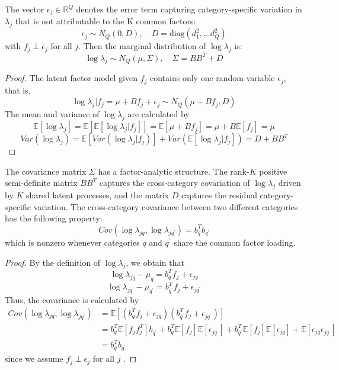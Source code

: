\documentclass[]{article}
\theoremstyle{definition}
\begin{document}
	The vector $\epsilon_{j}\in \mathbb{R}^{Q}$ denotes the error term capturing category-specific variation in $\lambda_{j}$ that is not attributable to the K common factors:
	\begin{equation}
		\epsilon_{j}\sim N_{Q}(0,D), \quad D=\text{diag}(d_{1}^{2},\dots d_{Q}^{2})
	\end{equation} 
	with $f_{j}\perp \epsilon_{j}$ for all $j$. Then the marginal distribution of $\log \lambda_{j}$ is:
	\begin{equation}
		\log \lambda_{j}\sim N_{Q}(\mu, \Sigma),\quad \Sigma=BB^{T}+D
	\end{equation}
    \begin{proof}
    The latent factor model given $f_{j}$ contains only one random variable $\epsilon_{j}$, that is, 
    \begin{equation*}
    \log \lambda_{j}|f_{j}=\mu+Bf_{j}+\epsilon_{j}\sim N_{Q}(\mu+Bf_{j},D)
    \end{equation*}
    The mean and variance of $\log \lambda_{j}$ are calculated by
    \begin{equation*}
    \mathbb{E}[\log \lambda_{j}]= \mathbb{E}[\mathbb{E}[\log \lambda_{j}|f_{j}]]= \mathbb{E}[\mu+Bf_{j}]=\mu+B\mathbb{E}[f_{j}]=\mu
    \end{equation*}
    \begin{equation*}
    Var(\log \lambda_{j})=\mathbb{E}[Var(\log \lambda_{j}|f_{j})]+Var(\mathbb{E}[\log \lambda_{j}|f_{j}])=D+BB^{T}
    \end{equation*}
    \end{proof}
    The covariance matrix $\Sigma$ has a factor-analytic structure. The rank-$K$  positive semi-definite matrix $BB^{T}$  captures the cross-category covariation of $\log \lambda_{j}$  driven by $K$  shared latent processes, and the matrix $D$  captures the residual category-specific variation. The cross-category covariance between two different categories has the following property:
    \begin{equation}
    Cov(\log \lambda_{jq}, \log \lambda_{jq^{'}})=b_{q}^{T}b_{q^{'}}
    \end{equation}
which is nonzero whenever categories $q$  and $q^{'}$  share the common factor loading.
\begin{proof}
    By the definition of $\log \lambda_{j}$, we obtain that 
\[\log \lambda_{jq}-\mu_{q}=b^{T}_{q}f_{j}+\epsilon_{jq}\]
\[\log \lambda_{jq^{'}}-\mu_{q^{'}}=b^{T}_{q^{'}}f_{j}+\epsilon_{jq^{'}}\]
    Thus, the covariance is calculated by
\begin{align*}
    Cov(\log \lambda_{jq}, \log \lambda_{jq^{'}}) &= \mathbb{E}[(b_{q}^{T}f_{j}+\epsilon_{jq})(b_{q^{'}}^{T}f_{j}+\epsilon_{jq^{'}})] \\
    &= b_{q}^{T}\mathbb{E}[f_{j}f_{j}^{T}]b_{q^{'}}+b_{q}^{T}\mathbb{E}[f_{j}]\mathbb{E}[\epsilon_{jq^{'}}]+b_{q^{'}}^{T}\mathbb{E}[f_{j}]\mathbb{E}[\epsilon_{jq}]+\mathbb{E}[\epsilon_{jq}\epsilon_{jq^{'}}] \\
    &= b_{q}^{T}b_{q^{'}}
\end{align*}
since we assume  $f_{j}\perp \epsilon_{j}$  for all $j$ . 
\end{proof}
\end{document}
